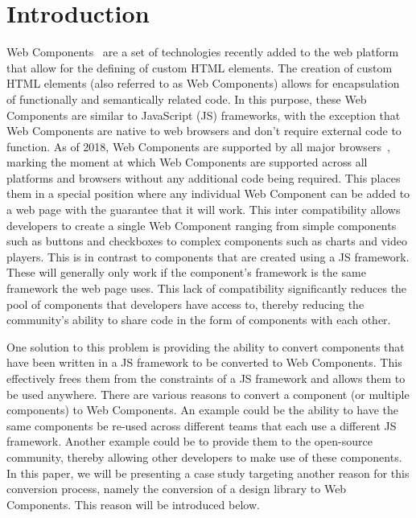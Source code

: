 \chapter{Introduction}
Web Components~ are a set of technologies recently added to the web platform that allow for the defining of custom HTML elements. The creation of custom HTML elements (also referred to as Web Components) allows for encapsulation of functionally and semantically related code. In this purpose, these Web Components are similar to JavaScript (JS) frameworks, with the exception that Web Components are native to web browsers and don't require external code to function. As of 2018, Web Components are supported by all major browsers~, marking the moment at which Web Components are supported across all platforms and browsers without any additional code being required. This places them in a special position where any individual Web Component can be added to a web page with the guarantee that it will work. This inter compatibility allows developers to create a single Web Component ranging from simple components such as buttons and checkboxes to complex components such as charts and video players. This is in contrast to components that are created using a JS framework. These will generally only work if the component's framework is the same framework the web page uses. This lack of compatibility significantly reduces the pool of components that developers have access to, thereby reducing the community's ability to share code in the form of components with each other.

One solution to this problem is providing the ability to convert components that have been written in a JS framework to be converted to Web Components. This effectively frees them from the constraints of a JS framework and allows them to be used anywhere. There are various reasons to convert a component (or multiple components) to Web Components. An example could be the ability to have the same components be re-used across different teams that each use a different JS framework. Another example could be to provide them to the open-source community, thereby allowing other developers to make use of these components. In this paper, we will be presenting a case study targeting another reason for this conversion process, namely the conversion of a design library to Web Components. This reason will be introduced below.

